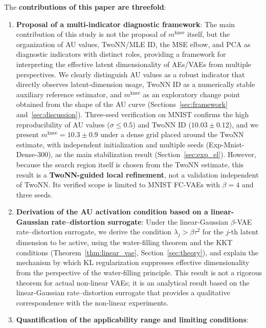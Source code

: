 \documentclass[make,article,submit,pdftex,moreauthors]{Definitions/mdpi}
\newcommand{\mknee}{m^{\mathrm{knee}}}
\begin{document}
The \textbf{contributions of this paper are threefold}:
\begin{enumerate}
  \item \textbf{Proposal of a multi-indicator diagnostic framework}:
        The main contribution of this study is not the proposal of $\mknee$ itself,
        but the organization of AU values, TwoNN/MLE ID, the MSE elbow, and PCA as
        diagnostic indicators with distinct roles, providing a framework for
        interpreting the effective latent dimensionality of AEs/VAEs from multiple
        perspectives.
        We clearly distinguish AU values as a robust indicator that directly
        observes latent-dimension usage,
        TwoNN ID as a numerically stable auxiliary reference estimator, and
        $\mknee$ as an exploratory change point obtained from the shape of the AU curve
        (Sections~\ref{sec:framework} and~\ref{sec:discussion}).
        Three-seed verification on MNIST confirms the high reproducibility of
        AU values ($\sigma \leq 0.5$) and TwoNN ID ($10.03 \pm 0.12$), and we
        present $\mknee = 10.3 \pm 0.9$ under a dense grid placed around the TwoNN
        estimate, with independent initialization and multiple seeds
        (Exp-Mnist-Dense-300), as the main stabilization result
        (Section~\ref{sec:exp_el}).
        However, because the search region itself is chosen from the TwoNN
        estimate, this result is a \textbf{TwoNN-guided local refinement}, not a
        validation independent of TwoNN.
        Its verified scope is limited to MNIST FC-VAEs with $\beta = 4$ and three
        seeds.
  \item \textbf{Derivation of the AU activation condition based on a linear-Gaussian
        rate--distortion surrogate}:
        Under the linear-Gaussian $\beta$-VAE rate--distortion surrogate, we derive
        the condition $\lambda_j > \beta\tau^2$ for the $j$-th latent dimension to be
        active, using the water-filling theorem and the KKT conditions
        (Theorem~\ref{thm:linear_vae}, Section~\ref{sec:theory}), and explain the
        mechanism by which KL regularization suppresses effective dimensionality
        from the perspective of the water-filling principle.
        This result is not a rigorous theorem for actual non-linear VAEs; it is an
        analytical result based on the linear-Gaussian rate--distortion surrogate
        that provides a qualitative correspondence with the non-linear experiments.
  \item \textbf{Quantification of the applicability range and limiting conditions}:

\end{enumerate}
\end{document}
